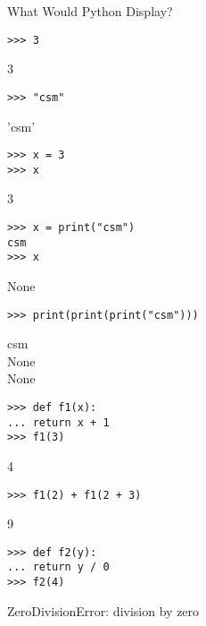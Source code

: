 \question What Would Python Display?

\begin{lstlisting}
>>> 3
\end{lstlisting}
\begin{solution}[.2in]
3
\end{solution}

\begin{lstlisting}
>>> "csm"
\end{lstlisting}
\begin{solution}[.2in]
'csm'
\end{solution}

\begin{lstlisting}
>>> x = 3
>>> x
\end{lstlisting}
\begin{solution}[.2in]
3
\end{solution}

\begin{lstlisting}
>>> x = print("csm")
csm
>>> x
\end{lstlisting}
\begin{solution}[.2in]
None
\end{solution}

\begin{lstlisting}
>>> print(print(print("csm")))
\end{lstlisting}
\begin{solution}[.6in]
csm \\
None \\
None
\end{solution}

\begin{lstlisting}
>>> def f1(x):
...	return x + 1
>>> f1(3)
\end{lstlisting}
\begin{solution}[.2in]
4
\end{solution}

\begin{lstlisting}
>>> f1(2) + f1(2 + 3)
\end{lstlisting}
\begin{solution}[.2in]
9
\end{solution}

\begin{lstlisting}
>>> def f2(y):
...	return y / 0
>>> f2(4)
\end{lstlisting}
\begin{solution}[.2in]
ZeroDivisionError: division by zero
\end{solution}

